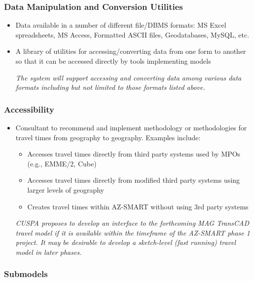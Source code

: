 \subsubsection{Data Manipulation and Conversion Utilities}

\begin{itemize}

\item Data available in a number of different file/DBMS formats: MS Excel spreadsheets, MS Access, Formatted ASCII files, Geodatabases, MySQL, etc.
\item A library of utilities for accessing/converting data from one form to another so that it can be accessed directly by tools implementing models

\emph{The system will support accessing and converting data among various data formats including but not limited to those formats listed above.}

\end{itemize}

\subsubsection{Accessibility}

\begin{itemize}

\item Consultant to recommend and implement methodology or methodologies for travel times from geography to geography. Examples include:
\begin{itemize}
\item Accesses travel times directly from third party systems used by MPOs (e.g., EMME/2, Cube)
\item Accesses travel times directly from modified third party systems using larger levels of geography
\item Creates travel times within AZ-SMART without using 3rd party systems
\end{itemize}

\emph{CUSPA proposes to develop an interface to the forthcoming MAG TransCAD travel model if it is available within the timeframe of the AZ-SMART phase 1 project.  It may be desirable to develop a sketch-level (fast running) travel model in later phases.}

\end{itemize}

\subsubsection{Submodels}

